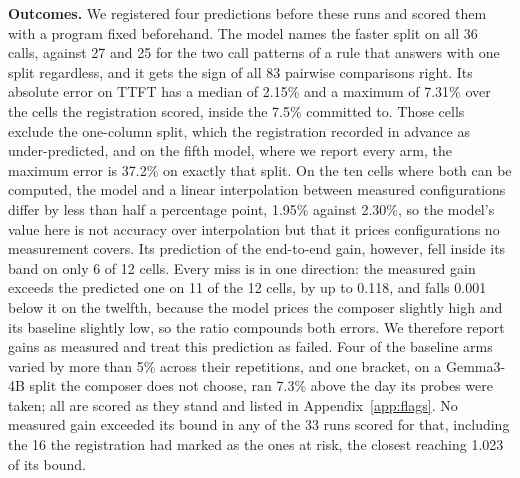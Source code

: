 
\textbf{Outcomes.}
We registered four predictions before these runs and scored them with a program fixed beforehand.
The model names the faster split on all 36 calls, against 27 and 25 for the two call patterns of a rule that answers with one split regardless, and it gets the sign of all 83 pairwise comparisons right.
Its absolute error on TTFT has a median of 2.15\% and a maximum of 7.31\% over the cells the registration scored, inside the 7.5\% committed to. Those cells exclude the one-column split, which the registration recorded in advance as under-predicted, and on the fifth model, where we report every arm, the maximum error is 37.2\% on exactly that split. On the ten cells where both can be computed, the model and a linear interpolation between measured configurations differ by less than half a percentage point, 1.95\% against 2.30\%, so the model's value here is not accuracy over interpolation but that it prices configurations no measurement covers.
Its prediction of the end-to-end gain, however, fell inside its band on only 6 of 12 cells.
Every miss is in one direction: the measured gain exceeds the predicted one on 11 of the 12 cells, by up to 0.118, and falls 0.001 below it on the twelfth, because the model prices the composer slightly high and its baseline slightly low, so the ratio compounds both errors.
We therefore report gains as measured and treat this prediction as failed.
Four of the baseline arms varied by more than 5\% across their repetitions, and one bracket, on a Gemma3-4B split the composer does not choose, ran 7.3\% above the day its probes were taken; all are scored as they stand and listed in Appendix~\ref{app:flags}.
No measured gain exceeded its bound in any of the 33 runs scored for that, including the 16 the registration had marked as the ones at risk, the closest reaching 1.023 of its bound.
